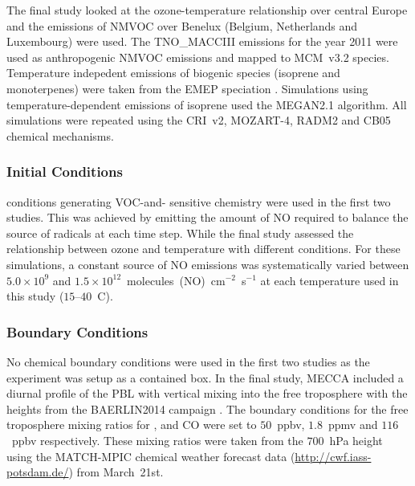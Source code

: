 The final study looked at the ozone-temperature relationship over central Europe and the emissions of NMVOC over Benelux (Belgium, Netherlands and Luxembourg) were used.
The TNO\_MACCIII emissions for the year 2011 were used as anthropogenic NMVOC emissions and mapped to MCM~v3.2 species.
Temperature indepedent emissions of biogenic species (isoprene and monoterpenes) were taken from the EMEP speciation \citep{Simpson:2012}.
Simulations using temperature-dependent emissions of isoprene used the MEGAN2.1 \citep{Guenther:2012} algorithm.
All simulations were repeated using the CRI~v2, MOZART-4, RADM2 and CB05 chemical mechanisms.

\subsubsection{ Initial Conditions} 
 conditions generating VOC-and- sensitive chemistry were used in the first two studies.
This was achieved by emitting the amount of NO required to balance the source of radicals at each time step.
While the final study assessed the relationship between ozone and temperature with different  conditions.
For these simulations, a constant source of NO emissions was systematically varied between $5.0 \times 10^9$ and $1.5 \times 10^{12}$~molecules~(NO)~cm$^{-2}$~s$^{-1}$ at each temperature used in this study ($15$--$40$~\degree C).

\subsubsection{Boundary Conditions} 
No chemical boundary conditions were used in the first two studies as the experiment was setup as a contained box.
In the final study, MECCA included a diurnal profile of the PBL with vertical mixing into the free troposphere with the heights from the BAERLIN2014 campaign \citep{Bonn:2016}.
The boundary conditions for the free troposphere mixing ratios for ,  and CO were set to $50$~ppbv, $1.8$~ppmv and $116$~ppbv respectively. 
These mixing ratios were taken from the $700$~hPa height using the MATCH-MPIC chemical weather forecast data (\url{http://cwf.iass-potsdam.de/}) from March~21st.
